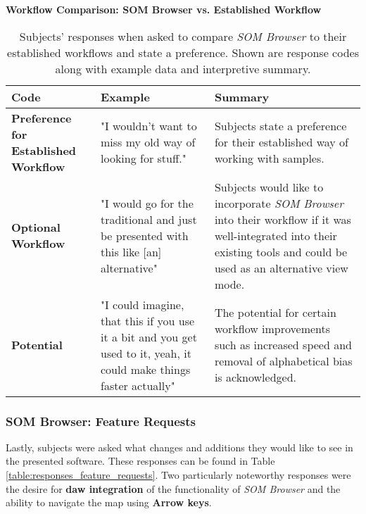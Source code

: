 \begin{table}[!htb]
  \renewcommand{\arraystretch}{1.2}
  \centering
  \textbf{Workflow Comparison: SOM Browser vs. Established Workflow} \\ [3mm]
  \footnotesize
  \colorbox{light-bg}{
  \begin{tabular}{ p{4.0cm} p{4.75cm} p{4.75cm} }
    \hline
    \textbf{Code} & \textbf{Example} & \textbf{Summary} \\
    \hline
    \textbf{Preference for Established Workflow}
    &
    "I wouldn't want to miss my old way of looking for stuff."
    &
    Subjects state a preference for their established way of working with
    samples.
    \\
    \textbf{Optional Workflow}
    &
    "I would go for the traditional and just be presented with this like [an]
    alternative"
    &
    Subjects would like to incorporate \textit{SOM Browser} into their workflow
    if it was well-integrated into their existing tools and could be used as an
    alternative view mode.
    \\
    \textbf{Potential}
    &
    "I could imagine, that this if you use it a bit and you get used to it,
    yeah, it could make things faster actually"
    &
    The potential for certain workflow improvements such as increased speed and
    removal of alphabetical bias is acknowledged.
    \\
  \end{tabular}}
  \caption[Workflow Comparison \textit{SOM Browser} vs. Established Workflow]
  {Subjects' responses when asked to compare \textit{SOM Browser} to their
  established workflows and state a preference. Shown are response codes along
  with example data and interpretive summary.}
  \label{table:responses_workflow_comparison}
\end{table}


\subsubsection{SOM Browser: Feature Requests}
\label{subsubsec:feature_requests}
Lastly, subjects were asked what changes and additions they would like to see in
the presented software. These responses can be found in Table
\ref{table:responses_feature_requests}. Two particularly noteworthy responses
were the desire for \textbf{\gls{daw} integration} of the functionality of
\textit{SOM Browser} and the ability to navigate the map using
\textbf{Arrow keys}.

